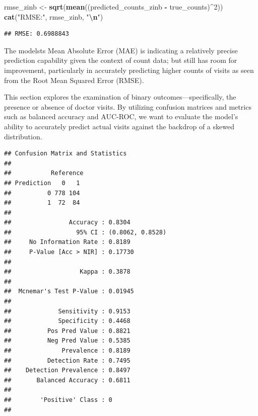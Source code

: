 \documentclass[
]{article}
\newenvironment{Shaded}{\begin{snugshade}}{\end{snugshade}}
\newcommand{\DecValTok}[1]{\textcolor[rgb]{0.00,0.00,0.81}{#1}}
\newcommand{\FunctionTok}[1]{\textcolor[rgb]{0.13,0.29,0.53}{\textbf{#1}}}
\newcommand{\NormalTok}[1]{#1}
\newcommand{\OtherTok}[1]{\textcolor[rgb]{0.56,0.35,0.01}{#1}}
\newcommand{\SpecialCharTok}[1]{\textcolor[rgb]{0.81,0.36,0.00}{\textbf{#1}}}
\newcommand{\StringTok}[1]{\textcolor[rgb]{0.31,0.60,0.02}{#1}}
\begin{document}
\begin{Shaded}
\begin{Highlighting}[]
\NormalTok{rmse\_zinb }\OtherTok{\textless{}{-}} \FunctionTok{sqrt}\NormalTok{(}\FunctionTok{mean}\NormalTok{((predicted\_counts\_zinb }\SpecialCharTok{{-}}\NormalTok{ true\_counts)}\SpecialCharTok{\^{}}\DecValTok{2}\NormalTok{))}
\FunctionTok{cat}\NormalTok{(}\StringTok{"RMSE:"}\NormalTok{, rmse\_zinb, }\StringTok{"}\SpecialCharTok{\textbackslash{}n}\StringTok{"}\NormalTok{)}
\end{Highlighting}
\end{Shaded}

\begin{verbatim}
## RMSE: 0.6988843
\end{verbatim}

The modelsts Mean Absolute Error (MAE) is indicating a relatively
precise prediction capability given the context of count data; but still
has room for improvement, particularly in accurately predicting higher
counts of visits as seen from the Root Mean Squared Error (RMSE).

This section explores the examination of binary outcomes---specifically,
the presence or absence of doctor visits. By utilizing confusion
matrices and metrics such as balanced accuracy and AUC-ROC, we want to
evaluate the model's ability to accurately predict actual visits against
the backdrop of a skewed distribution.

\begin{verbatim}
## Confusion Matrix and Statistics
## 
##           Reference
## Prediction   0   1
##          0 778 104
##          1  72  84
##                                           
##                Accuracy : 0.8304          
##                  95% CI : (0.8062, 0.8528)
##     No Information Rate : 0.8189          
##     P-Value [Acc > NIR] : 0.17730         
##                                           
##                   Kappa : 0.3878          
##                                           
##  Mcnemar's Test P-Value : 0.01945         
##                                           
##             Sensitivity : 0.9153          
##             Specificity : 0.4468          
##          Pos Pred Value : 0.8821          
##          Neg Pred Value : 0.5385          
##              Prevalence : 0.8189          
##          Detection Rate : 0.7495          
##    Detection Prevalence : 0.8497          
##       Balanced Accuracy : 0.6811          
##                                           
##        'Positive' Class : 0               
## 
\end{verbatim}
\end{document}
